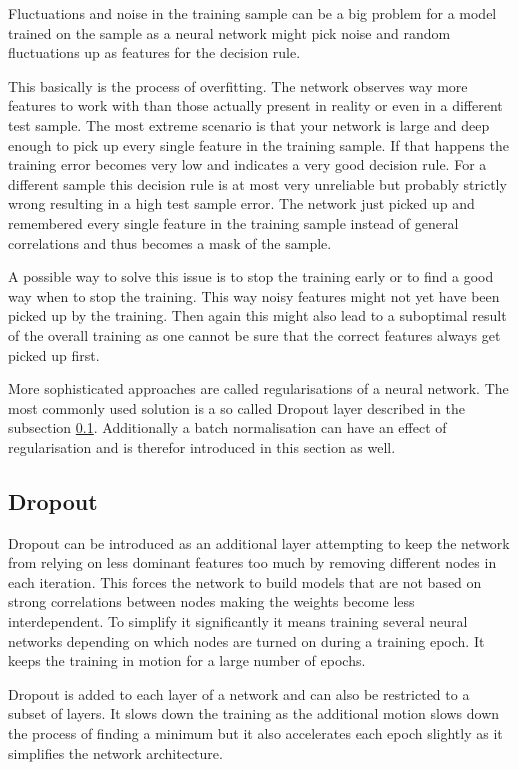 Fluctuations and noise in the training sample can be a big problem for a model trained on the sample as a neural network might pick noise and random fluctuations up as features for the decision rule.

This basically is the process of overfitting. The network observes way more features to work with than those actually present in reality or even in a different test sample. The most extreme scenario is that your network is large and deep enough to pick up every single feature in the training sample. If that happens the training error becomes very low and indicates a very good decision rule. For a different sample this decision rule is at most very unreliable but probably strictly wrong resulting in a high test sample error. The network just picked up and remembered every single feature in the training sample instead of general correlations and thus becomes a mask of the sample.

A possible way to solve this issue is to stop the training early or to find a good way when to stop the training. This way noisy features might not yet have been picked up by the training. Then again this might also lead to a suboptimal result of the overall training as one cannot be sure that the correct features always get picked up first.

More sophisticated approaches are called regularisations of a neural network. The most commonly used solution is a so called Dropout layer described in the subsection \ref{sec:dropout}. Additionally a batch normalisation can have an effect of regularisation and is therefor introduced in this section as well.

\subsection{Dropout}
\label{sec:dropout}

Dropout can be introduced as an additional layer attempting to keep the network from relying on less dominant features too much by removing different nodes in each iteration. This forces the network to build models that are not based on strong correlations between nodes making the weights become less interdependent. To simplify it significantly it means training several neural networks depending on which nodes are turned on during a training epoch. It keeps the training in motion for a large number of epochs.

Dropout is added to each layer of a network and can also be  restricted to a subset of layers. It slows down the training as the additional motion slows down the process of finding a minimum but it also accelerates each epoch slightly as it simplifies the network architecture. 

